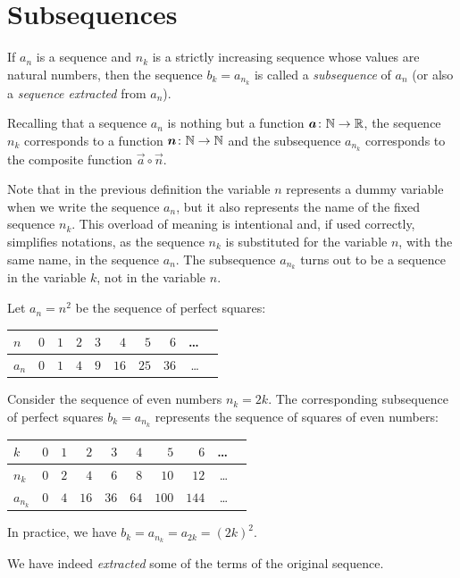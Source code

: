 \section{Subsequences}

\begin{definition}[subsequence]
\mymark{*}
If $a_n$ is a sequence and $n_k$ is a strictly increasing sequence whose values
are natural numbers, then the sequence
$b_k = a_{n_k}$ is called a \emph{subsequence}%
%
 of $a_n$
(or also a \emph{sequence extracted} from $a_n$).
\end{definition}

Recalling that a sequence $a_n$ is nothing but a function
$\boldsymbol a\colon {\mathbb N} \to {\mathbb R}$, the sequence $n_k$ corresponds to a function
$\boldsymbol n\colon {\mathbb N} \to {\mathbb N}$ and the subsequence $a_{n_k}$ corresponds to the
composite function $\vec a \circ \vec n$.

Note that in the previous definition the variable $n$ represents
a dummy variable when we write the sequence $a_n$, but
it also represents the name of the fixed sequence $n_k$.
This overload
of meaning is intentional and, if used correctly, simplifies
notations, as the sequence $n_k$ is substituted for the
variable $n$, with the same name, in the sequence $a_n$.
The subsequence $a_{n_k}$ turns out to be a sequence in the variable $k$, not in
the variable $n$.

\begin{example}
Let $a_n = n^2$ be the sequence of perfect squares:
\begin{center}
\begin{tabular}{l|rrrrrrrrr}
$n$   & $0$ & $1$ & $2$ & $3$ & $4$  & $5$  & $6$  & \dots \\ \hline
$a_n$ & $0$ & $1$ & $4$ & $9$ & $16$ & $25$ & $36$ & \dots
\end{tabular}
\end{center}
Consider the sequence of even numbers $n_k = 2k$.
The corresponding subsequence of perfect squares
$b_k = a_{n_k}$
represents the sequence of squares of even numbers:
\begin{center}
\begin{tabular}{l|rrrrrrrrr}
$k$       & $0$ & $1$ & $2$ & $3$ & $4$  & $5$  & $6$  & \dots \\ \hline
$n_k$ & $0$ & $2$ & $4$ & $6$ & $8$ & $10$ & $12$ & \dots \\
$a_{n_k}$ & $0$ & $4$ & $16$ & $36$ & $64$ & $100$ & $144$ & \dots
\end{tabular}
\end{center}
In practice, we have
  $b_k = a_{n_k} = a_{2k} = (2k)^2$.

We have indeed \emph{extracted} some of the terms of the original sequence.
\end{example}

